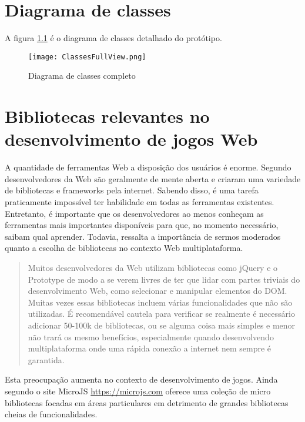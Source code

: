 \chapter{Diagrama de classes}

A figura \ref{fig:fullDiagram} é o diagrama de classes detalhado do protótipo.
\begin{figure}[H]
    \centering
    \texttt{[image: ClassesFullView.png]}
	\caption{Diagrama de classes completo}
    \label{fig:fullDiagram}
\end{figure}

\chapter{Bibliotecas relevantes no desenvolvimento de jogos Web}

A quantidade de ferramentas Web a disposição dos usuários é enorme.
Segundo \citet{html5mostwanted} desenvolvedores da Web são geralmente
de mente aberta e criaram uma variedade de bibliotecas e frameworks
pela internet. Sabendo disso, é uma tarefa praticamente impossível
ter habilidade em todas as ferramentas existentes. Entretanto, é
importante que os desenvolvedores ao menos conheçam as ferramentas
mais importantes disponíveis para que, no momento necessário, saibam
qual aprender. Todavia, \citet{creatingFun} ressalta a importância
de sermos moderados quanto a escolha de bibliotecas no contexto Web
multiplataforma.

\begin{quote}
Muitos desenvolvedores da Web utilizam bibliotecas como jQuery e o
Prototype de modo a se verem livres de ter que lidar com
partes triviais do desenvolvimento Web, como selecionar e
manipular elementos do DOM. Muitas vezes essas bibliotecas incluem
várias funcionalidades que não são utilizadas. É recomendável
cautela para verificar se realmente é necessário adicionar 50-100k
de bibliotecas, ou se alguma coisa mais simples e menor não trará
os mesmo benefícios, especialmente quando desenvolvendo
multiplataforma onde uma rápida conexão a internet nem sempre é
garantida.
\end{quote}

Esta preocupação aumenta no contexto de desenvolvimento
de jogos. Ainda segundo \citet{creatingFun} o site MicroJS
\url{https://microjs.com} oferece uma coleção de micro bibliotecas
focadas em áreas particulares em detrimento de grandes bibliotecas
cheias de funcionalidades.

